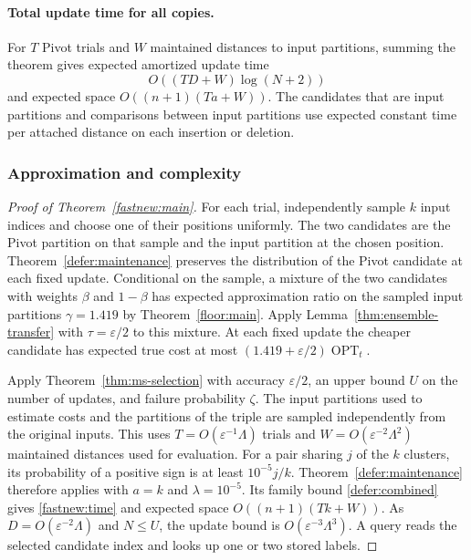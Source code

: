 \documentclass[11pt]{article}
\begin{document}
\paragraph{Total update time for all copies.}
For $T$ Pivot trials and $W$ maintained distances to input partitions,
summing the theorem gives expected amortized update time
\begin{equation}\label{defer:combined}
 O((TD+W)\log(N+2))
\end{equation}
and expected space $O((n+1)(Ta+W))$. The candidates that are input partitions and
comparisons between input partitions use expected constant time per attached
distance on each insertion or deletion.

\subsubsection{Approximation and complexity}

\begin{proof}[Proof of Theorem~\ref{fastnew:main}]
For each trial, independently sample $k$ input indices and choose one
of their positions uniformly. The two candidates are the Pivot partition
on that sample and the input partition at the chosen position.
Theorem~\ref{defer:maintenance} preserves the distribution of the Pivot
candidate at each fixed update. Conditional on the sample, a mixture of the
two candidates with weights $\beta$ and $1-\beta$ has expected approximation
ratio on the sampled input partitions $\gamma=1.419$ by Theorem~\ref{floor:main}.
Apply Lemma~\ref{thm:ensemble-transfer} with $\tau=\varepsilon/2$ to
this mixture. At each fixed update the cheaper candidate has expected
true cost at most $(1.419+\varepsilon/2)\operatorname{OPT}_t$.

Apply Theorem~\ref{thm:ms-selection} with accuracy $\varepsilon/2$,
an upper bound $U$ on the number of updates, and failure probability $\zeta$. The input
partitions used to estimate costs and the partitions
of the triple are sampled independently from the original inputs. This uses
$T=O(\varepsilon^{-1}\Lambda)$ trials and
$W=O(\varepsilon^{-2}\Lambda^2)$ maintained distances used for evaluation. For a pair sharing $j$ of the $k$ clusters, its probability of a positive sign
is at least $10^{-5}j/k$. Theorem~\ref{defer:maintenance} therefore
applies with $a=k$ and $\lambda=10^{-5}$. Its family bound
\eqref{defer:combined} gives \eqref{fastnew:time} and expected space
$O((n+1)(Tk+W))$. As $D=O(\varepsilon^{-2}\Lambda)$ and $N\le U$,
the update bound is $O(\varepsilon^{-3}\Lambda^3)$. A query reads the
selected candidate index and looks up one or two stored labels.
\end{proof}
\end{document}
